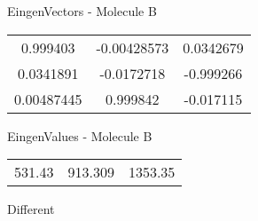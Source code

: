 \begin{multicols}{2}
\begin{center}
\vtab
 EingenVectors - Molecule B     \\
\vtab
\begin{tabular}{|c c c|}
0.999403	 & 	-0.00428573	 & 	0.0342679	 \\
0.0341891	 & 	-0.0172718	 & 	-0.999266	 \\
0.00487445	 & 	0.999842	 & 	-0.017115
\end{tabular}

\vtab
 EingenValues - Molecule B     \\
\vtab
\begin{tabular}{|c c c|}
531.43	 & 	913.309	 & 	1353.35	 \\
\end{tabular}

\end{center}
\end{multicols}
\begin{center}
\vtab
\vtab
\textcolor{NavyBlue}{\Large Different}
\end{center}

 \newpage

